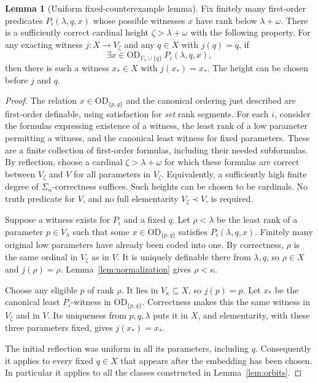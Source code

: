 \documentclass[11pt,letterpaper]{article}
\theoremstyle{definition}
\newtheorem{lemma}[definition]{Lemma}
\newcommand{\OD}{\mathrm{OD}}
\newcommand{\ODq}{\OD_{V_\lambda\cup\{q\}}}
\begin{document}
\begin{lemma}[Uniform fixed-counterexample lemma]\label{lem:canonical}
Fix finitely many first-order predicates $P_i(\lambda,q,x)$ whose possible witnesses $x$ have rank below $\lambda+\omega$. There is a sufficiently correct cardinal height $\zeta>\lambda+\omega$ with the following property. For any exacting witness $j:X\to V_\zeta$ and any $q\in X$ with $j(q)=q$, if
\[
 \exists x\in\ODq\ P_i(\lambda,q,x),
\]
then there is such a witness $x_*\in X$ with $j(x_*)=x_*$. The height can be chosen before $j$ and $q$.
\end{lemma}

\begin{proof}
The relation $x\in\OD_{\{p,q\}}$ and the canonical ordering just described are first-order definable, using satisfaction for \emph{set} rank segments. For each $i$, consider the formulas expressing existence of a witness, the least rank of a low parameter permitting a witness, and the canonical least witness for fixed parameters. These are a finite collection of first-order formulas, including their needed subformulas. By reflection, choose a cardinal $\zeta>\lambda+\omega$ for which these formulas are correct between $V_\zeta$ and $V$ for all parameters in $V_\zeta$. Equivalently, a sufficiently high finite degree of $\Sigma_n$-correctness suffices. Such heights can be chosen to be cardinals. No truth predicate for $V$, and no full elementarity $V_\zeta\prec V$, is required.

Suppose a witness exists for $P_i$ and a fixed $q$. Let $\rho<\lambda$ be the least rank of a parameter $p\in V_\lambda$ such that some $x\in\OD_{\{p,q\}}$ satisfies $P_i(\lambda,q,x)$. Finitely many original low parameters have already been coded into one. By correctness, $\rho$ is the same ordinal in $V_\zeta$ as in $V$. It is uniquely definable there from $\lambda,q$, so $\rho\in X$ and $j(\rho)=\rho$. Lemma~\ref{lem:normalization} gives $\rho<\kappa$.

Choose any eligible $p$ of rank $\rho$. It lies in $V_\kappa\subseteq X$, so $j(p)=p$. Let $x_*$ be the canonical least $P_i$-witness in $\OD_{\{p,q\}}$. Correctness makes this the same witness in $V_\zeta$ and in $V$. Its uniqueness from $p,q,\lambda$ puts it in $X$, and elementarity, with these three parameters fixed, gives $j(x_*)=x_*$.

The initial reflection was uniform in all its parameters, including $q$. Consequently it applies to every fixed $q\in X$ that appears after the embedding has been chosen. In particular it applies to all the classes constructed in Lemma~\ref{lem:orbits}.
\end{proof}
\end{document}
